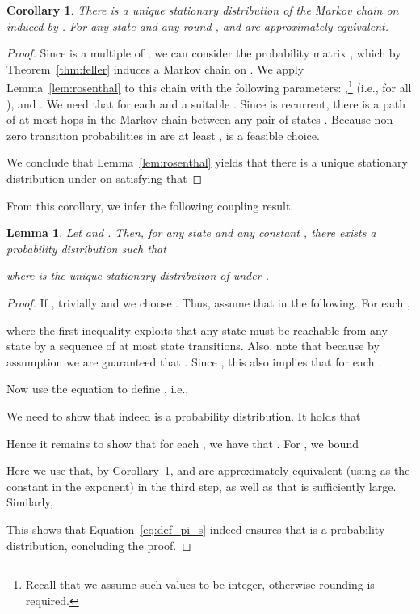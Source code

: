 \documentclass[11pt]{article}
\newtheorem{lemma}[theorem]{Lemma}
\newtheorem{corollary}[theorem]{Corollary}
\begin{document}
\begin{corollary}
\label{cor:bound}
	There is a unique stationary distribution  of the Markov chain on  induced by . For any state  and any round ,  and  are approximately equivalent.
\end{corollary}

\begin{proof}
	Since  is a multiple of , we can consider the probability matrix , which by Theorem~\ref{thm:feller} induces a Markov chain on . We apply Lemma~\ref{lem:rosenthal} to this chain with the following parameters: ,\footnote{Recall that we assume such values to be integer, otherwise rounding is required.}  (i.e.,  for all ), and . We need that  for each  and a suitable . Since  is recurrent, there is a path of at most  hops in the Markov chain between any pair of states . Because non-zero transition probabilities in  are at least ,  is a feasible choice.
	
	We conclude that Lemma~\ref{lem:rosenthal} yields that there is a unique stationary distribution  under  on  satisfying that 
	
\end{proof}

From this corollary, we infer the following coupling result.
\begin{lemma}
\label{lem:pi_s}
	Let  and . Then, for any state  and any constant , there exists a probability distribution  such that

where  is the unique stationary distribution of  under .
\end{lemma}
\begin{proof}
If , trivially  and we choose . Thus, assume that  in the following. For each ,

where the first inequality exploits that any state  must be reachable from any state  by a sequence of at most  state transitions. Also, note that  because by assumption we are guaranteed that . Since , this also implies that  for each .

	Now use the equation  to define , i.e.,
	
	We need to show that  indeed is a probability distribution. It holds that
	
	
	Hence it remains to show that for each , we have that . For , we bound
	
	Here we use that, by Corollary~\ref{cor:bound},  and  are approximately equivalent (using  as the constant in the exponent) in the third step, as well as that  is sufficiently large. Similarly,

This shows that Equation~\eqref{eq:def_pi_s} indeed ensures that  is a probability distribution, concluding the proof.
\end{proof}
\end{document}
